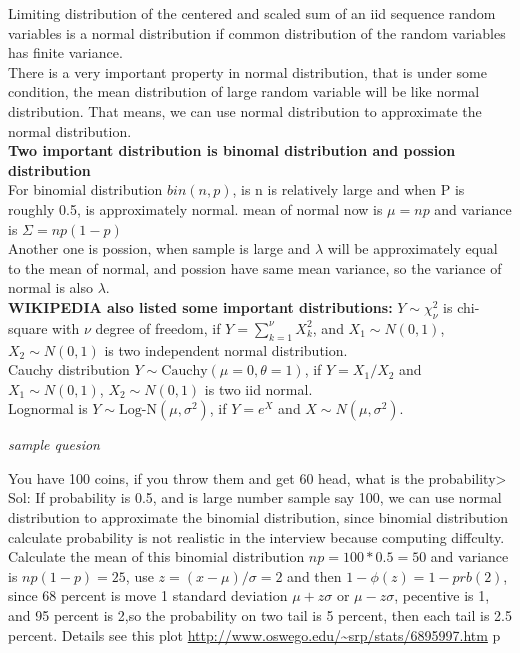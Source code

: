 \documentclass[a4paper,11pt]{article}
\begin{document}
Limiting distribution of the centered and scaled sum of an iid sequence random variables is a normal distribution if common distribution of the random variables has finite variance.\\
There is a very important property in normal distribution, that is under some condition, the mean distribution of large random variable will be like normal distribution. That means, we can use normal distribution to approximate the normal distribution.\\
{\bf Two important distribution is binomal distribution and possion distribution}\\
For binomial distribution $bin(n,p)$, is n is relatively large and when P is roughly 0.5, is approximately normal. mean of normal now is $\mu=np$ and variance is $\Sigma=np(1-p)$\\
Another one is possion, when sample is large and $\lambda$ will be approximately equal to the mean of normal, and possion have same mean variance, so the variance of normal is also $\lambda$.\\
{\bf WIKIPEDIA also listed some important distributions:}
$Y \sim \chi_{\nu}^2$ is chi-square with $\nu$ degree of freedom, if $Y = \sum_{k=1}^{\nu} X_k^2$, and $X_1 \sim N(0,1)$, $X_2 \sim N(0,1)$ is two independent normal distribution.\\
Cauchy distribution $Y \sim \mathrm{Cauchy}(\mu = 0, \theta = 1)$, if $Y = X_1/X_2$ and $X_1 \sim N(0,1)$, $X_2 \sim N(0,1)$ is two iid normal.\\
Lognormal is $Y \sim \mbox{Log-N}(\mu, \sigma^2)$, if $Y = e^X$ and $X \sim N(\mu, \sigma^2)$.\\
\begin{centering}
\em {sample quesion\\}
\end{centering}
You have 100 coins, if you throw them and get 60 head, what is the probability>\\
Sol: If probability is 0.5, and is large number sample say 100, we can use normal distribution to approximate the binomial distribution, since binomial distribution calculate probability is not realistic in the interview because computing  diffculty. Calculate the mean of this binomial distribution $np=100*0.5=50$ and variance is $np(1-p)=25$, use $z=(x-\mu)/\sigma=2$ and then $1-\phi(z)=1-prb(2)$, since 68 percent is move 1 standard deviation $\mu + z\sigma$ or $\mu -z\sigma$, pecentive is 1, and 95 percent is 2,so the probability on two tail is 5 percent, then each tail is 2.5 percent. Details see this plot
\url{http://www.oswego.edu/~srp/stats/6895997.htm}
p
\end{document}
